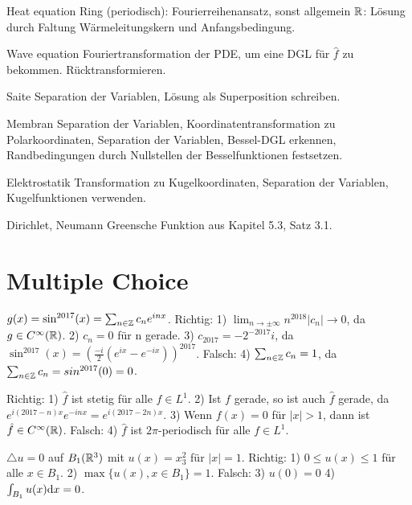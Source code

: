 \begin{namedtheorem}{Heat equation}
Ring (periodisch): Fourierreihenansatz, sonst allgemein $\mathbb{R}$: Lösung durch Faltung Wärmeleitungskern und Anfangsbedingung.
\end{namedtheorem}

\begin{namedtheorem}{Wave equation}
Fouriertransformation der PDE, um eine DGL für $\hat{f}$ zu bekommen. Rücktransformieren.
\end{namedtheorem}

\begin{namedtheorem}{Saite}
Separation der Variablen, Lösung als Superposition schreiben.
\end{namedtheorem}

\begin{namedtheorem}{Membran}
Separation der Variablen, Koordinatentransformation zu Polarkoordinaten, Separation der Variablen, Bessel-DGL erkennen, Randbedingungen durch Nullstellen der Besselfunktionen festsetzen.
\end{namedtheorem}

\begin{namedtheorem}{Elektrostatik}
Transformation zu Kugelkoordinaten, Separation der Variablen, Kugelfunktionen verwenden.
\end{namedtheorem}

\begin{namedtheorem}{Dirichlet, Neumann}
Greensche Funktion aus Kapitel 5.3, Satz 3.1.
\end{namedtheorem}

\section{Multiple Choice}

$g(x)=\sin^{2017}(x)=\sum_{n\in\mathbb{Z}}c_ne^{inx}$. Richtig: 1) $\lim_{n\rightarrow\pm\infty}n^{2018}|c_n|\rightarrow0$, da $g\in C^{\infty}(\mathbb{R})$. 2) $c_n=0$ für n gerade. 3) $c_{2017}=-2^{-2017}i$, da $\sin^{2017}(x)=(\frac{-i}2(e^{ix}-e^{-ix}))^{2017}$. Falsch: 4) $\sum_{n\in\mathbb{Z}}c_n=1$, da $\sum_{n\in\mathbb{Z}}c_n=sin^{2017}(0)=0$.

Richtig: 1) $\hat{f}$ ist stetig für alle $f\in L^1$. 2) Ist $f$ gerade, so ist auch $\hat{f}$ gerade, da $e^{i(2017-n)x}e^{-inx}=e^{i(2017-2n)x}$. 3) Wenn $f(x)=0$ für $|x|>1$, dann ist $\hat{f}\in C^{\infty}(\mathbb{R})$. Falsch: 4) $\hat{f}$ ist $2\pi$-periodisch für alle $f\in L^1$.

$\triangle u=0$ auf $B_1(\mathbb{R}^3)$ mit $u(x)=x_3^2$ für $|x|=1$. Richtig: 1) $0\leq u(x)\leq 1$ für alle $x\in B_1$. 2) $\max\{u(x),x\in B_1\} = 1$. Falsch: 3) $u(0)=0$ 4) $\int_{B_1}u(x)\mathrm{d}x = 0$.

